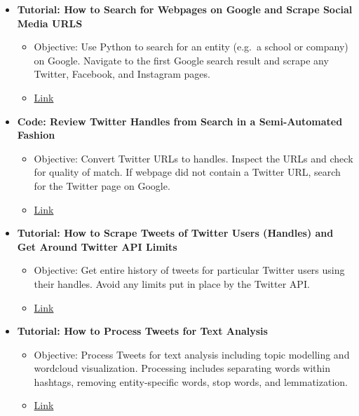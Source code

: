 \documentclass[11pt]{article}
\providecommand{\tightlist}{%
      \setlength{\itemsep}{0pt}\setlength{\parskip}{0pt}}
\begin{document}
    \begin{itemize}
\tightlist
\item
  \textbf{Tutorial: How to Search for Webpages on Google and Scrape
  Social Media URLS}

  \begin{itemize}
  \tightlist
  \item
    Objective: Use Python to search for an entity (e.g.~a school or
    company) on Google. Navigate to the first Google search result and
    scrape any Twitter, Facebook, and Instagram pages.
  \item
    \href{https://laurendahlin.github.io/colleges_on_social_media/Html/01_scrape_social_handles_final}{Link}
  \end{itemize}
\item
  \textbf{Code: Review Twitter Handles from Search in a Semi-Automated
  Fashion}

  \begin{itemize}
  \tightlist
  \item
    Objective: Convert Twitter URLs to handles. Inspect the URLs and
    check for quality of match. If webpage did not contain a Twitter
    URL, search for the Twitter page on Google.
  \item
    \href{https://laurendahlin.github.io/colleges_on_social_media/Html/02_twitter_username_etl_final}{Link}
  \end{itemize}
\item
  \textbf{Tutorial: How to Scrape Tweets of Twitter Users (Handles) and
  Get Around Twitter API Limits}

  \begin{itemize}
  \tightlist
  \item
    Objective: Get entire history of tweets for particular Twitter users
    using their handles. Avoid any limits put in place by the Twitter
    API.
  \item
    \href{https://laurendahlin.github.io/colleges_on_social_media/Html/03_scrape_tweets_final}{Link}
  \end{itemize}
\item
  \textbf{Tutorial: How to Process Tweets for Text Analysis}

  \begin{itemize}
  \tightlist
  \item
    Objective: Process Tweets for text analysis including topic
    modelling and wordcloud visualization. Processing includes
    separating words within hashtags, removing entity-specific words,
    stop words, and lemmatization.
  \item
    \href{https://laurendahlin.github.io/colleges_on_social_media/Html/04_tweet_processing}{Link}
  \end{itemize}
\end{itemize}


    
    
    
    
\end{document}
